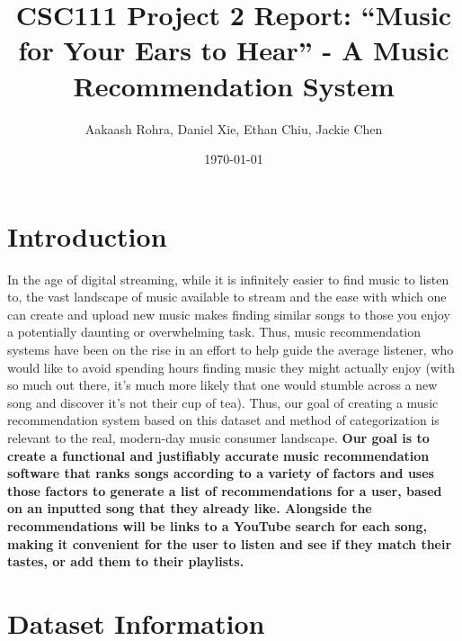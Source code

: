 \documentclass[fontsize=11pt]{article}
\title{CSC111 Project 2 Report: “Music for Your Ears to Hear” - A Music Recommendation System}
\author{Aakaash Rohra, Daniel Xie, Ethan Chiu, Jackie Chen
}
\date{\today}
\begin{document}
\maketitle

\section*{Introduction}

\hspace{\parindent} In the age of digital streaming, while it is infinitely easier to find music to listen to, the vast landscape of music available to stream and the ease with which one can create and upload new music makes finding similar songs to those you enjoy a potentially daunting or overwhelming task. Thus, music recommendation systems have been on the rise in an effort to help guide the average listener, who would like to avoid spending hours finding music they might actually enjoy (with so much out there, it’s much more likely that one would stumble across a new song and discover it’s not their cup of tea). Thus, our goal of creating a music recommendation system based on this dataset and method of categorization is relevant to the real, modern-day music consumer landscape. \textbf{Our goal is to create a functional and justifiably accurate music recommendation software that ranks songs according to a variety of factors and uses those factors to generate a list of recommendations for a user, based on an inputted song that they already like. Alongside the recommendations will be links to a YouTube search for each song, making it convenient for the user to listen and see if they match their tastes, or add them to their playlists.}

\section*{Dataset Information}
\end{document}
